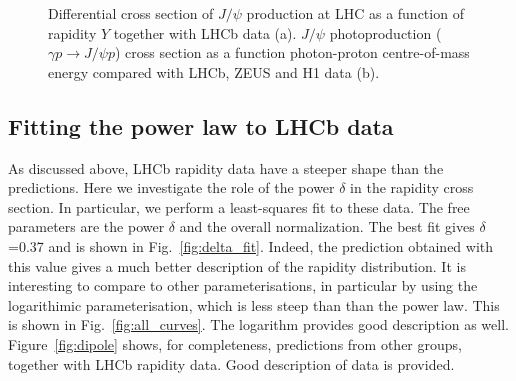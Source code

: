 \documentclass[12pt]{article}
\begin{document}
\begin{figure}[!h]
  \centering
  \caption{Differential cross section of $J/\psi$ production at LHC as a function of rapidity $Y$ together with LHCb data (a). $J/\psi$ photoproduction ($\gamma p \to J/\psi p$) cross section as a function photon-proton centre-of-mass energy compared
           with LHCb, ZEUS and H1 data (b).}
\end{figure}

\subsection{Fitting the power law to LHCb data}

As discussed above, LHCb rapidity data have a steeper shape than the predictions.
Here we investigate the role of the power $\delta$ in the rapidity cross section.
In particular, we perform a least-squares fit to these data.
The free parameters are the power $\delta$ and the overall normalization.
The best fit gives $\delta$=0.37 and is shown in Fig.~\ref{fig:delta_fit}.
Indeed, the prediction  obtained with this value gives a much better description of the rapidity distribution.
It is interesting  to compare to other parameterisations, in particular by using the
logarithimic parameterisation, which is less steep than than the power law.
This is shown  in Fig.~\ref{fig:all_curves}. The logarithm provides good description as well.
Figure~\ref{fig:dipole} shows, for completeness, predictions from other groups, together with LHCb rapidity data.
Good description of data is provided.
\end{document}
